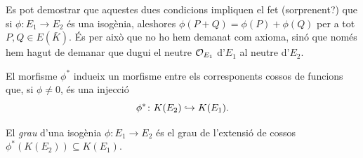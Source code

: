\begin{remark}
Es pot demostrar que aquestes dues condicions impliquen el fet (sorprenent?) que si $\phi\colon E_1\to E_2$ és una isogènia, aleshores $\phi(P+Q)=\phi(P)+\phi(Q)$ per a tot $P,Q\in E(\bar K)$. És per això que no ho hem demanat com axioma, sinó que només hem hagut de demanar que dugui el neutre $\mathcal{O}_{E_1}$ d'$E_1$ al neutre d'$E_2$.
\end{remark}

El morfisme $\phi^*$ indueix un morfisme entre els corresponents cossos de funcions que, si $\phi\neq 0$, és una injecció
\[
\phi^*\colon K(E_2)\hookrightarrow K(E_1).
\]

\begin{definition}
El \emph{grau} d'una isogènia $\phi\colon E_1\to E_2$ és el grau de l'extensió de cossos $\phi^*(K(E_2))\subseteq K(E_1)$.
\end{definition}

